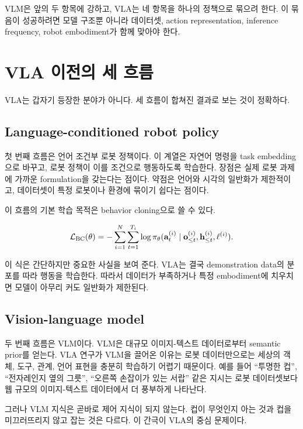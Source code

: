VLM은 앞의 두 항목에 강하고, VLA는 네 항목을 하나의 정책으로 묶으려 한다. 이 묶음이 성공하려면 모델 구조뿐 아니라 데이터셋, action representation, inference frequency, robot embodiment가 함께 맞아야 한다.

\section{VLA 이전의 세 흐름}

VLA는 갑자기 등장한 분야가 아니다. 세 흐름이 합쳐진 결과로 보는 것이 정확하다.

\subsection{Language-conditioned robot policy}

첫 번째 흐름은 언어 조건부 로봇 정책이다. 이 계열은 자연어 명령을 task embedding으로 바꾸고, 로봇 정책이 이를 조건으로 행동하도록 학습한다. 장점은 실제 로봇 과제에 가까운 formulation을 갖는다는 점이다. 약점은 언어와 시각의 일반화가 제한적이고, 데이터셋이 특정 로봇이나 환경에 묶이기 쉽다는 점이다.

이 흐름의 기본 학습 목적은 behavior cloning으로 쓸 수 있다.

\begin{equation}
  \mathcal{L}_{\mathrm{BC}}(\theta)
  =
  -\sum_{i=1}^{N}\sum_{t=1}^{T_i}
  \log \pi_\theta(\mathbf{a}^{(i)}_t \mid \mathbf{o}^{(i)}_{\le t}, \mathbf{h}^{(i)}_{\le t}, \ell^{(i)}).
  \label{eq:bc}
\end{equation}

이 식은 간단하지만 중요한 사실을 보여 준다. VLA는 결국 demonstration data의 분포를 따라 행동을 학습한다. 따라서 데이터가 부족하거나 특정 embodiment에 치우치면 모델이 아무리 커도 일반화가 제한된다.

\subsection{Vision-language model}

두 번째 흐름은 VLM이다. VLM은 대규모 이미지-텍스트 데이터로부터 semantic prior를 얻는다. VLA 연구가 VLM을 끌어온 이유는 로봇 데이터만으로는 세상의 객체, 도구, 관계, 언어 표현을 충분히 학습하기 어렵기 때문이다. 예를 들어 ``투명한 컵'', ``전자레인지 옆의 그릇'', ``오른쪽 손잡이가 있는 서랍'' 같은 지시는 로봇 데이터셋보다 웹 규모의 이미지-텍스트 데이터에서 더 풍부하게 나타난다.

그러나 VLM 지식은 곧바로 제어 지식이 되지 않는다. 컵이 무엇인지 아는 것과 컵을 미끄러뜨리지 않고 잡는 것은 다르다. 이 간극이 VLA의 중심 문제이다.

